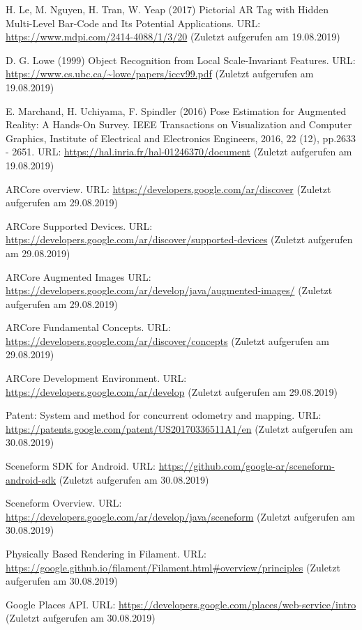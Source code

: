 \documentclass[12pt,oneside]{scrreprt}
\begin{document}
\begin{thebibliography}{10}
 H. Le, M. Nguyen, H. Tran, W. Yeap (2017) Pictorial AR Tag with Hidden Multi-Level Bar-Code and Its Potential Applications. URL: \url{https://www.mdpi.com/2414-4088/1/3/20} (Zuletzt aufgerufen am 19.08.2019)

 D. G. Lowe (1999) Object Recognition from Local Scale-Invariant Features. URL: \url{https://www.cs.ubc.ca/~lowe/papers/iccv99.pdf} (Zuletzt aufgerufen am 19.08.2019)

 E. Marchand, H. Uchiyama, F. Spindler (2016) Pose Estimation for Augmented Reality: A Hands-On Survey. IEEE Transactions on Visualization and Computer Graphics, Institute of Electrical and Electronics Engineers, 2016, 22 (12), pp.2633 - 2651. URL: \url{https://hal.inria.fr/hal-01246370/document} (Zuletzt aufgerufen am 19.08.2019)

 ARCore overview. URL: \url{https://developers.google.com/ar/discover} (Zuletzt aufgerufen am 29.08.2019)

 ARCore Supported Devices. URL: \url{https://developers.google.com/ar/discover/supported-devices} (Zuletzt aufgerufen am 29.08.2019)

 ARCore Augmented Images URL: \url{https://developers.google.com/ar/develop/java/augmented-images/} (Zuletzt aufgerufen am 29.08.2019)

 ARCore Fundamental Concepts. URL: \url{https://developers.google.com/ar/discover/concepts} (Zuletzt aufgerufen am 29.08.2019)

 ARCore Development Environment. URL: \url{https://developers.google.com/ar/develop} (Zuletzt aufgerufen am 29.08.2019)

 Patent: System and method for concurrent odometry and mapping. URL: \url{https://patents.google.com/patent/US20170336511A1/en} (Zuletzt aufgerufen am 30.08.2019)

 Sceneform SDK for Android. URL: \url{https://github.com/google-ar/sceneform-android-sdk} (Zuletzt aufgerufen am 30.08.2019)

 Sceneform Overview. URL: \url{https://developers.google.com/ar/develop/java/sceneform} (Zuletzt aufgerufen am 30.08.2019)

 Physically Based Rendering in Filament. URL: \url{https://google.github.io/filament/Filament.html#overview/principles} (Zuletzt aufgerufen am 30.08.2019)

 Google Places API. URL: \url{https://developers.google.com/places/web-service/intro} (Zuletzt aufgerufen am 30.08.2019)














	\end{thebibliography}  
  \newpage
  
  \listoffigures
  \newpage
 
  
\end{document}
